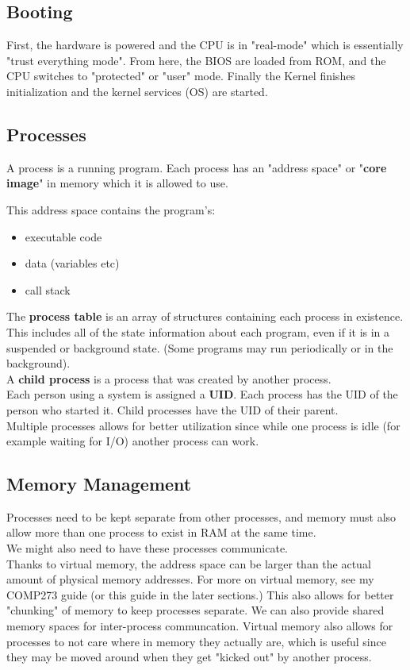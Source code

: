 \documentclass[12pt]{article}
\theoremstyle{definition}
\begin{document}
\subsection{Booting}
First, the hardware is powered and the CPU is in "real-mode" which is essentially "trust everything mode". From here, the BIOS are loaded from ROM, and the CPU switches to "protected" or "user" mode. Finally the Kernel finishes initialization and the kernel services (OS) are started.

\subsection{Processes}
A process is a running program. Each process has an "address space" or "\textbf{core image}" in memory which it is allowed to use.
\\ \linebreak

This address space contains the program's: 
\begin{itemize}
	\item executable code
	\item data (variables etc)
	\item call stack
\end{itemize}
The \textbf{process table} is an array of structures containing each process in existence. This includes all of the state information about each program, even if it is in a suspended or background state. (Some programs may run periodically or in the background).
\\ \linebreak
A \textbf{child process} is a process that was created by another process.
\\ \linebreak
Each person using a system is assigned a \textbf{UID}. Each process has the UID of the person who started it. Child processes have the UID of their parent.
\\ \linebreak
Multiple processes allows for better utilization since while one process is idle (for example waiting for I/O) another process can work.
\subsection{Memory Management}
Processes need to be kept separate from other processes, and memory must also allow more than one process to exist in RAM at the same time.
\\ \linebreak
We might also need to have these processes communicate.
\\ \linebreak
Thanks to virtual memory, the address space can be larger than the actual amount of physical memory addresses. For more on virtual memory, see my COMP273 guide (or this guide in the later sections.) This also allows for better "chunking" of memory to keep processes separate. We can also provide shared memory spaces for inter-process communcation. Virtual memory also allows for processes to not care where in memory they actually are, which is useful since they may be moved around when they get "kicked out" by another process.
\end{document}
